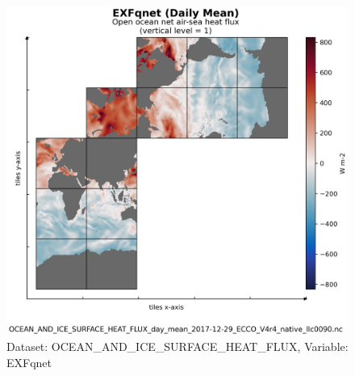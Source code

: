 \begin{figure}[H]
\centering
\includegraphics[scale=0.55]{../images/plots/v4r4/native_plots/Ocean_and_Sea-Ice_Surface_Heat_Fluxes/EXFqnet.png}
\caption{Dataset: OCEAN\_AND\_ICE\_SURFACE\_HEAT\_FLUX, Variable: EXFqnet}
\label{tab:table-OCEAN_AND_ICE_SURFACE_HEAT_FLUX_EXFqnet-Plot}
\end{figure}
\newpage
\pagebreak
